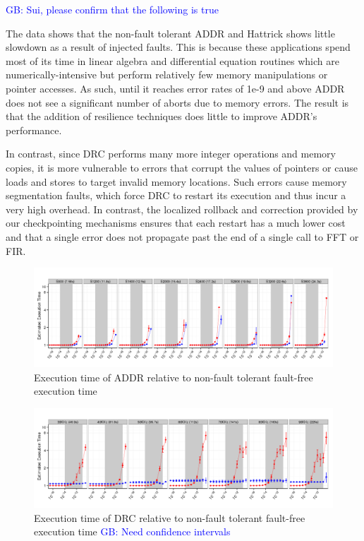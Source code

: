 \documentclass{sig-alternate}
\newcommand{\greg}[1]{%
  \textcolor{blue}{GB: #1}
}
\begin{document}
{\greg{Sui, please confirm that the following is true}
The data shows that the non-fault tolerant ADDR and Hattrick shows little slowdown as a result of injected faults.
This is because these applications spend most of its time in linear algebra and differential equation routines which are numerically-intensive but perform relatively few memory manipulations or pointer accesses.
As such, until it reaches error rates of 1e-9 and above ADDR does not see a significant number of aborts due to memory errors.
The result is that the addition of resilience techniques does little to improve ADDR's performance.

In contrast, since DRC performs many more integer operations and memory copies, it is more vulnerable to errors that corrupt the values of pointers or cause loads and stores to target invalid memory locations.
Such errors cause memory segmentation faults, which force DRC to restart its execution and thus incur a very high overhead.
In contrast, the localized rollback and correction provided by our checkpointing mechanisms ensures that each restart has a much lower cost and that a single error does not propagate past the end of a single call to FFT or FIR.

\begin{figure}[ht!]
\centering
\includegraphics[width=2.00\columnwidth]{figs/Lasso_EstdCost.png}
\vspace{-10pt}
\caption{Execution time of ADDR relative to non-fault tolerant fault-free execution time}
\vspace{-10pt}
\label{fig:Lasso_EstdCost}
\end{figure}

\begin{figure}[ht!]
\centering
\includegraphics[width=2.00\columnwidth]{figs/DRC_EstdCost.png}
\vspace{-10pt}
\caption{Execution time of DRC relative to non-fault tolerant fault-free execution time \greg{Need confidence intervals}}
\vspace{-10pt}
\label{fig:DRC_EstdCost}
\end{figure}

}
\end{document}
